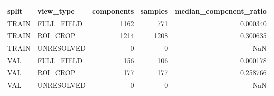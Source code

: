 \begin{tabular}{llrrr}
\toprule
split & view_type & components & samples & median_component_ratio \\
\midrule
TRAIN & FULL_FIELD & 1162 & 771 & 0.000340 \\
TRAIN & ROI_CROP & 1214 & 1208 & 0.300635 \\
TRAIN & UNRESOLVED & 0 & 0 & NaN \\
VAL & FULL_FIELD & 156 & 106 & 0.000178 \\
VAL & ROI_CROP & 177 & 177 & 0.258766 \\
VAL & UNRESOLVED & 0 & 0 & NaN \\
\bottomrule
\end{tabular}
